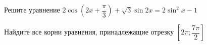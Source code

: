 \begin{ex}
	\begin{condition}
		\begin{enumcols}[label=\asbuk*)]
			\item Решите уравнение \( 2\cos{\left(2x+  \dfrac{\pi}{3}\right)} + \sqrt{3} \sin 2x = 2\sin^2 x - 1  \)
			\item Найдите все корни уравнения, принадлежащие отрезку \(  \left[2\pi;\dfrac{7\pi}{2}\right] \)
		\end{enumcols}
	\end{condition}
\end{ex}